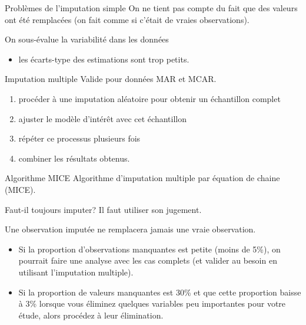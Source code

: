 \documentclass[
  ignorenonframetext,
]{beamer}
\providecommand{\tightlist}{%
  \setlength{\itemsep}{0pt}\setlength{\parskip}{0pt}}\usepackage{longtable,booktabs,array}
\begin{document}
\begin{frame}{Problèmes de l'imputation simple}
\protect\hypertarget{probluxe8mes-de-limputation-simple}{}
On ne tient pas compte du fait que des valeurs ont été remplacées (on
fait comme si c'était de vraies observations).

On sous-évalue la variabilité dans les données

\begin{itemize}
\tightlist
\item
  les écarts-type des estimations sont trop petits.
\end{itemize}
\end{frame}

\begin{frame}{Imputation multiple}
\protect\hypertarget{imputation-multiple}{}
Valide pour données MAR et MCAR.

\begin{enumerate}
\tightlist
\item
  procéder à une imputation aléatoire pour obtenir un échantillon
  complet
\item
  ajuster le modèle d'intérêt avec cet échantillon
\item
  répéter ce processus plusieurs fois
\item
  combiner les résultats obtenus.
\end{enumerate}
\end{frame}

\begin{frame}{Algorithme MICE}
\protect\hypertarget{algorithme-mice}{}
Algorithme d'imputation multiple par équation de chaine (MICE).
\end{frame}

\begin{frame}{Faut-il toujours imputer?}
\protect\hypertarget{faut-il-toujours-imputer}{}
Il faut utiliser son jugement.

Une observation imputée ne remplacera jamais une vraie observation.

\begin{itemize}
\tightlist
\item
  Si la proportion d'observations manquantes est petite (moins de 5\%),
  on pourrait faire une analyse avec les cas complets (et valider au
  besoin en utilisant l'imputation multiple).
\item
  Si la proportion de valeurs manquantes est 30\% et que cette
  proportion baisse à 3\% lorsque vous éliminez quelques variables peu
  importantes pour votre étude, alors procédez à leur élimination.
\end{itemize}
\end{frame}
\end{document}
